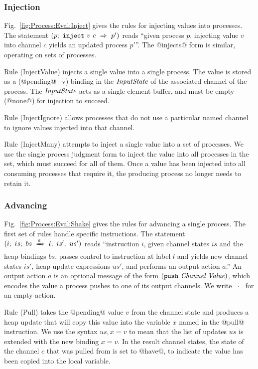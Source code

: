 \subsubsection{Injection}
Fig.~\ref{fig:Process:Eval:Inject} gives the rules for injecting values into processes. The statement $(p;~\texttt{inject}~v~c~\Rightarrow~p')$ reads ``given process $p$, injecting value $v$ into channel $c$ yields an updated process $p'$''. The @injects@ form is similar, operating on sets of processes.

Rule (InjectValue) injects a single value into a single process. The value is stored as a (@pending@~ v) binding in the $\textit{InputState}$ of the associated channel of the process. The $\textit{InputState}$ acts as a single element buffer, and must be empty (@none@) for injection to succeed.

Rule (InjectIgnore) allows processes that do not use a particular named channel to ignore values injected into that channel.

Rule (InjectMany) attempts to inject a single value into a set of processes. We use the single process judgment form to inject the value into all processes in the set, which must succeed for all of them. Once a value has been injected into all consuming processes that require it, the producing process no longer needs to retain it.






\subsubsection{Advancing}
Fig.~\ref{fig:Process:Eval:Shake} gives the rules for advancing a single process. The first set of rules handle specific instructions. The statement $(i;~is;~bs~\xRightarrow{a}~l;~is';~us')$ reads ``instruction $i$, given channel states $is$ and the heap bindings $bs$, passes control to instruction at label $l$ and yields new channel states $is'$, heap update expressions $us'$, and performs an output action $a$.'' An output action $a$ is an optional message of the form $(\texttt{push}~\textit{Channel}~\textit{Value})$, which encodes the value a process pushes to one of its output channels. We write ~$\cdot$~ for an empty action. 

Rule (Pull) takes the @pending@ value $v$ from the channel state and produces a heap update that will copy this value into the variable $x$ named in the @pull@ instruction. We use the syntax $us,x=v$ to mean that the list of updates $us$ is extended with the new binding $x=v$. In the result channel states, the state of the channel $c$ that was pulled from is set to @have@, to indicate the value has been copied into the local variable.

